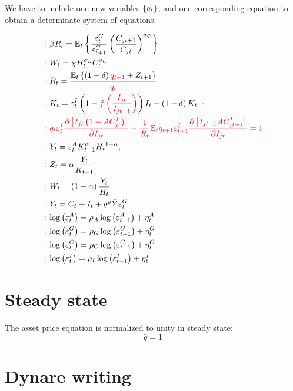 \documentclass{article}%
\begin{document}
We have to include one new variables $\{\textcolor{red}{q_{t}}\}$, and one
corresponding equation to obtain a determinate system of equations:%

\begin{align*}
&  :\beta R_{t}=\mathbb{E}_{t}\left\{  \frac{\varepsilon_{t}^{C}}%
{\varepsilon_{t+1}^{C}}\left(  \frac{C_{jt+1}}{C_{jt}}\right)  ^{\sigma_{C}%
}\right\} \\
&  :W_{t}=\chi H_{t}^{\sigma_{L}}C_{t}^{\sigma_{C}}\\
&  :R_{t}=\frac{\mathbb{E}_{t}\left\{  \left(  1-\delta\right)
\textcolor{red}{q_{t+1}}+Z_{t+1}\right\}  }{\textcolor{red}{q_{t}}}\\
&  :K_{t}=\varepsilon_{t}^{I}\left(
1-\textcolor{red}{f\left(\frac{I_{jt}}{I_{jt-1}}\right)}\right)  I_{t}+\left(
1-\delta\right)  K_{t-1}\\
&
:\textcolor{red}{ q_{t}\varepsilon_{t}^{I}\frac{\partial\left[ I_{jt}\left( 1-AC_{jt}^{I}\right) \right] }{\partial I_{jt}}-\frac{1}{R_{t}}\mathbb{E}_{t}q_{t+1}\varepsilon_{t+1}^{I}\frac{\partial\left[ I_{jt+1}AC_{jt+1}^{I}\right] }{\partial I_{jt}}=1 }\\
&  :Y_{t}=\varepsilon_{t}^{A}K_{t-1}^{\alpha}H_{t}{}^{1-\alpha},\\
&  :Z_{t}=\alpha\frac{Y_{t}}{K_{t-1}}\\
&  :W_{t}=\left(  1-\alpha\right)  \frac{Y_{t}}{H_{t}}\\
&  :Y_{t}=C_{t}+I_{t}+g^{y}\bar{Y}\varepsilon_{t}^{G}\\
&  :\log\left(  \varepsilon_{t}^{A}\right)  =\rho_{A}\log\left(
\varepsilon_{t-1}^{A}\right)  +\eta_{t}^{A}\\
&  :\log\left(  \varepsilon_{t}^{G}\right)  =\rho_{G}\log\left(
\varepsilon_{t-1}^{G}\right)  +\eta_{t}^{G}\\
&  :\log\left(  \varepsilon_{t}^{C}\right)  =\rho_{C}\log\left(
\varepsilon_{t-1}^{C}\right)  +\eta_{t}^{C}\\
&  :\log\left(  \varepsilon_{t}^{I}\right)  =\rho_{I}\log\left(
\varepsilon_{t-1}^{I}\right)  +\eta_{t}^{I}%
\end{align*}


\section{Steady state}

The asset price equation is normalized to unity in steady state:%
\[
\bar{q}=1
\]


\section{Dynare writing}
\end{document}

